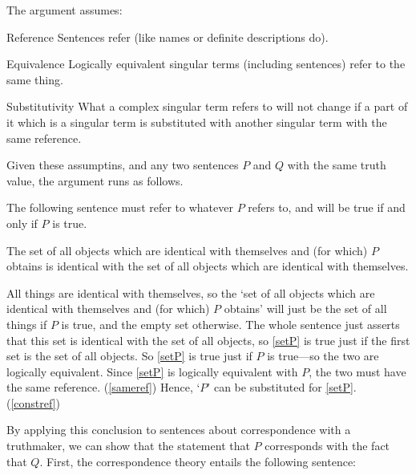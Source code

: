 The argument assumes:
\parencite[753]{Davidson_1969}

	\begin{principle}{Reference} \label{srefer}
	Sentences refer (like names or definite descriptions do).
	\end{principle}

	\begin{principle}{Equivalence} \label{sameref}
	Logically equivalent singular terms (including sentences) refer to the same thing.
	\end{principle}

	\begin{principle}{Substitutivity} \label{constref}
	What a complex singular term refers to will not change if a part of it which is a singular term is substituted with another singular term with the same reference.
	\end{principle}


Given these assumptins, and any two sentences $P$ and $Q$ with the same truth value, the argument runs as follows.

The following sentence must refer to whatever $P$ refers to, and will be true if and only if $P$ is true.

	\begin{example} \label{setP}
	The set of all objects which are identical with themselves and (for which) $P$ obtains is identical with the set of all objects which are identical with themselves.
	\end{example}

All things are identical with themselves, so the `set of all objects which are identical with themselves and (for which) $P$ obtains' will just be the set of all things if $P$ is true, and the empty set otherwise.
The whole sentence just asserts that this set is identical with the set of all objects, so \ref{setP} is true just if the first set is the set of all objects.
So \ref{setP} is true just if $P$ is true---so the two are logically equivalent.
Since \ref{setP} is logically equivalent with $P$, the two must have the same reference.
(\ref{sameref})
Hence, `$P$' can be substituted for \ref{setP}.
(\ref{constref})

By applying this conclusion to sentences about correspondence with a truthmaker, we can show that the statement that $P$ corresponds with the fact that $Q$.
First, the correspondence theory entails the following sentence:

